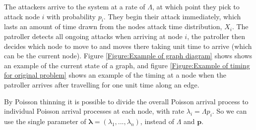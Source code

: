 \documentclass[a4paper,10pt]{article}
\theoremstyle{definition}
\theoremstyle{definition}
\theoremstyle{remark}
\theoremstyle{definition}
\begin{document}
The attackers arrive to the system at a rate of $\Lambda$, at which point they pick to attack node $i$ with probability $p_{i}$. They begin their attack immediately, which lasts an amount of time drawn from the nodes attack time distribution, $X_{i}$. The patroller detects all ongoing attacks when arriving at node $i$, the patroller then decides which node to move to and moves there taking unit time to arrive (which can be the current node). Figure \ref{Figure:Example of graph diagram} shows shows an example of the current state of a graph, and figure \ref{Figure:Example of timing for original problem} shows an example of the timing at a node when the patroller arrives after travelling for one unit time along an edge.

By Poisson thinning it is possible to divide the overall Poisson arrival process to individual Poisson arrival processes at each node, with rate $\lambda_{i}=\Lambda p_{i}$. So we can use the single parameter of $\bm{\lambda}=(\lambda_{1},...,\lambda_{n})$, instead of $\Lambda$ and $\bm{p}$.  
\end{document}
